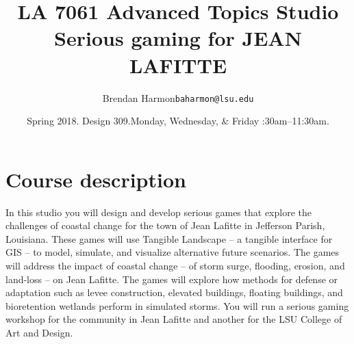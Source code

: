 \documentclass[11pt,article,oneside]{memoir}
\makeatletter
\def\myauthor{Author}
\def\mytitle{Title}
\def\mysubtitle{}
\def\myemail{baharmon@lsu.edu}
\def\myauthor{Brendan Harmon}
\def\mytitle{{\normalsize \textsc{LA} 7061 \newline \newline} \Large \bfseries Advanced Topics Studio \newline}
\def\mysubtitle{\large Serious gaming \newline \newline \tiny for \bfseries JEAN LAFITTE}
\newcommand{\globalcolor}[1]{%
  \color{#1}\global\let\default@color\current@color
}
\makeatother
\begin{document}
\setlength\bibitemsep{0.75em}

\setmainfont[Scale=1, Path = fonts/lato/,BoldItalicFont=Lato-RegIta,BoldFont=Lato-Reg,ItalicFont=Lato-LigIta]{Lato-Lig}
\setsansfont[Scale=1, Path = fonts/lato/,BoldItalicFont=Lato-RegIta,BoldFont=Lato-Reg,ItalicFont=Lato-LigIta]{Lato-Lig}
\setmonofont[Mapping=tex-text,Scale=0.8,Path = fonts/inconsolata/]{i}

\def\ind{\hangindent=1 true cm\hangafter=1 \noindent}
\def\labelitemi{$\cdot$}
\title{\LARGE \mytitle \newline \mysubtitle}     
\author{\large\myauthor \newline \footnotesize\texttt{\noindent\myemail}}
\date{\normalsize Spring 2018. Design 309.\newline Monday, Wednesday, \& Friday :30am--11:30am.}
\published{\,}


\globalcolor{black}
\vspace*{-10em}
\maketitle
\setlength{\wpXoffset}{-4em}
\vfill
\clearpage


\globalcolor{black}
\vspace*{-10em}
\maketitle

\section{Course description}
%
In this studio you will design and develop serious games
that explore the challenges of coastal change
for the town of Jean Lafitte in Jefferson Parish, Louisiana.   
%
These games will use Tangible Landscape
-- a tangible interface for GIS -- 
to model, simulate, and visualize alternative future scenarios. 
%
The games will address the impact of coastal change 
-- of storm surge, flooding, erosion, and land-loss --
on Jean Lafitte. 
%
The games will explore how methods for defense or adaptation 
such as levee construction, elevated buildings, floating buildings, 
and bioretention wetlands 
perform in simulated storms. 
%
You will  run a serious gaming workshop
for the community in Jean Lafitte
and another for the LSU College of Art and Design. 
\end{document}
